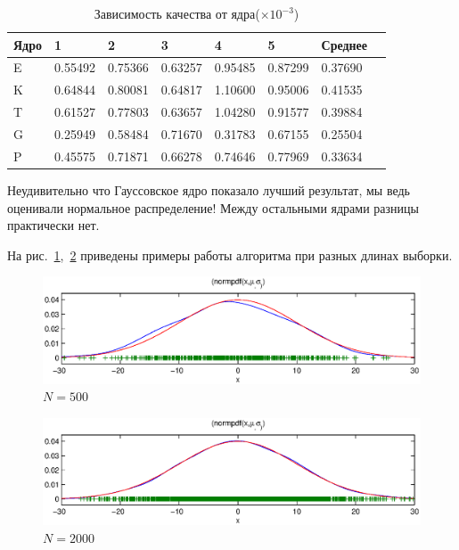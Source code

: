 \documentclass[10pt, a4paper]{article}
\begin{document}
\begin{table}[h]
    \begin{tabular}{|l|l|l|l|l|l|l|l|}
        \hline
        Ядро&1&2&3&4&5&Среднее\\
        \hline
        E&0.55492&0.75366&0.63257&0.95485&0.87299&0.37690\\
        \hline
        K&0.64844&0.80081&0.64817&1.10600&0.95006&0.41535\\
        \hline
        T&0.61527&0.77803&0.63657&1.04280&0.91577&0.39884\\
        \hline
        G&0.25949&0.58484&0.71670&0.31783&0.67155&0.25504\\
        \hline
        P&0.45575&0.71871&0.66278&0.74646&0.77969&0.33634\\
        \hline
    \end{tabular}
    \caption{Зависимость качества от ядра($\times 10^{-3}$)}
    \label{kernel_eval}
\end{table}

Неудивительно что Гауссовское ядро показало лучший результат, мы ведь оценивали нормальное распределение!
Между остальными ядрами разницы практически нет.

На рис.~\ref{parzen1_500},~\ref{parzen1_2000} приведены примеры работы алгоритма при разных длинах выборки.
\begin{figure}[h]
    \includegraphics[width=\textwidth]{parzen1_500.eps}
    \caption{$N=500$}
    \label{parzen1_500}
\end{figure}
\begin{figure}[h]
    \includegraphics[width=\textwidth]{parzen1_2000.eps}
    \caption{$N=2000$}
    \label{parzen1_2000}
\end{figure}
\end{document}
